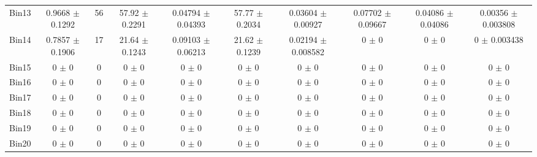\begin{tabular}{@{\extracolsep{4pt}}lccccccccc@{}}
     Bin13 & 0.9668 $\pm$ 0.1292 & 56 & 57.92 $\pm$ 0.2291 & 0.04794 $\pm$ 0.04393 & 57.77 $\pm$ 0.2034 & 0.03604 $\pm$ 0.00927 & 0.07702 $\pm$ 0.09667 & 0.04086 $\pm$ 0.04086 & 0.00356 $\pm$ 0.003808 \\ 
     Bin14 & 0.7857 $\pm$ 0.1906 & 17 & 21.64 $\pm$ 0.1243 & 0.09103 $\pm$ 0.06213 & 21.62 $\pm$ 0.1239 & 0.02194 $\pm$ 0.008582 & 0 $\pm$ 0 & 0 $\pm$ 0 & 0 $\pm$ 0.003438 \\ 
     Bin15 & 0 $\pm$ 0 & 0 & 0 $\pm$ 0 & 0 $\pm$ 0 & 0 $\pm$ 0 & 0 $\pm$ 0 & 0 $\pm$ 0 & 0 $\pm$ 0 & 0 $\pm$ 0 \\ 
     Bin16 & 0 $\pm$ 0 & 0 & 0 $\pm$ 0 & 0 $\pm$ 0 & 0 $\pm$ 0 & 0 $\pm$ 0 & 0 $\pm$ 0 & 0 $\pm$ 0 & 0 $\pm$ 0 \\ 
     Bin17 & 0 $\pm$ 0 & 0 & 0 $\pm$ 0 & 0 $\pm$ 0 & 0 $\pm$ 0 & 0 $\pm$ 0 & 0 $\pm$ 0 & 0 $\pm$ 0 & 0 $\pm$ 0 \\ 
     Bin18 & 0 $\pm$ 0 & 0 & 0 $\pm$ 0 & 0 $\pm$ 0 & 0 $\pm$ 0 & 0 $\pm$ 0 & 0 $\pm$ 0 & 0 $\pm$ 0 & 0 $\pm$ 0 \\ 
     Bin19 & 0 $\pm$ 0 & 0 & 0 $\pm$ 0 & 0 $\pm$ 0 & 0 $\pm$ 0 & 0 $\pm$ 0 & 0 $\pm$ 0 & 0 $\pm$ 0 & 0 $\pm$ 0 \\ 
     Bin20 & 0 $\pm$ 0 & 0 & 0 $\pm$ 0 & 0 $\pm$ 0 & 0 $\pm$ 0 & 0 $\pm$ 0 & 0 $\pm$ 0 & 0 $\pm$ 0 & 0 $\pm$ 0 \\ 
\hline\hline
  \end{tabular}
